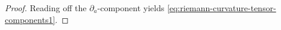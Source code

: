 \begin{proof}
Reading off the $\partial_a$-component yields \eqref{eq:riemann-curvature-tensor-components1}.










\end{proof}
